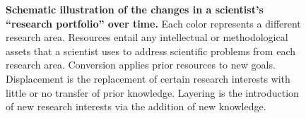 \documentclass{article}
\begin{document}
\begin{figure}

    \caption{\textbf{Schematic illustration of the changes in a scientist's ``research portfolio'' over time.} Each color represents a different research area. Resources entail any intellectual or methodological assets that a scientist uses to address scientific problems from each research area. Conversion applies prior resources to new goals. Displacement is the replacement of certain research interests with little or no transfer of prior knowledge. Layering is the introduction of new research interests via the addition of new knowledge.}
    \label{fig:research-agenda}
\end{figure}
\end{document}
